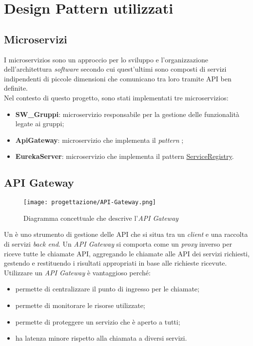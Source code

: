\section{Design Pattern utilizzati}
\subsection{Microservizi}
I \glspl{microservizio} sono un approccio per lo sviluppo e l'organizzazione dell'architettura \textit{software} secondo cui quest'ultimi sono composti di servizi indipendenti di piccole dimensioni che comunicano tra loro tramite \gls{API} ben definite.\\
Nel contesto di questo progetto, sono stati implementati tre \glspl{microservizio}: 
\begin{itemize}
    \item \textbf{SW\_Gruppi}: \gls{microservizio} responsabile per la gestione delle funzionalità legate ai gruppi;
    \item \textbf{ApiGateway}: \gls{microservizio} che implementa il \textit{pattern} ;
    \item \textbf{EurekaServer}: \gls{microservizio} che implementa il pattern \hyperref[sub:ServiceRegistry]{ServiceRegistry}. 
\end{itemize}
\subsection{API Gateway}
\label{sub:ApiGateway}
\begin{figure}[H] 
    \centering 
    \texttt{[image: progettazione/API-Gateway.png]} 
    \caption{Diagramma concettuale che descrive l'\textit{API Gateway}}
\end{figure}
Un  è uno strumento di gestione delle \gls{API} che si situa tra un \textit{client} e una raccolta di servizi \textit{back end}. Un \textit{API Gateway} si comporta come un \textit{proxy} inverso per riceve tutte le chiamate \gls{API}, aggregando le chiamate alle \gls{API} dei servizi richiesti, gestendo e restituendo i risultati appropriati in base alle richieste ricevute.\\
Utilizzare un \textit{API Gateway} è vantaggioso perché: 
\begin{itemize}
    \item permette di centralizzare il punto di ingresso per le chiamate;
    \item permette di monitorare le risorse utilizzate;
    \item permette di proteggere un servizio che è aperto a tutti;
    \item ha latenza minore rispetto alla chiamata a diversi servizi.
\end{itemize}

